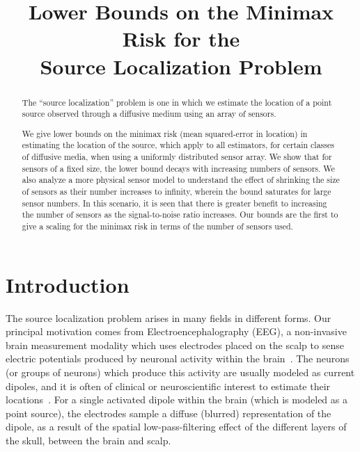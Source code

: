 \documentclass[conference,letterpaper]{IEEEtran}
\title{Lower Bounds on the Minimax Risk for the \\ Source Localization Problem}
\author{
	\IEEEauthorblockN{
		Praveen Venkatesh (\href{mailto:vpraveen@cmu.edu}{\texttt{vpraveen@cmu.edu}}) %
		and Pulkit Grover (\href{mailto:pulkit@cmu.edu}{\texttt{pulkit@cmu.edu}}) %
	}
	\IEEEauthorblockA{
		\textcolor{red}{Electrical \& Computer Engineering,
		and the Center for the Neural Basis of Cognition,
		Carnegie Mellon University}
	}
}
\begin{document}
\maketitle
\thispagestyle{plain}
\pagestyle{plain}

\begin{abstract}

The ``source localization'' problem is one in which we estimate the location of
a point source observed through a diffusive medium using an array of sensors.

We give lower bounds on the minimax risk (mean squared-error in location) in
estimating the location of the source, which apply to all estimators, for
certain classes of diffusive media, when using a uniformly distributed sensor
array. We show that for sensors of a fixed size, the lower bound decays with
increasing numbers of sensors. We also analyze a more physical sensor model to
understand the effect of shrinking the size of sensors as their number
increases to infinity, wherein the bound saturates for large sensor numbers.
In this scenario, it is seen that there is greater benefit to increasing the
number of sensors as the signal-to-noise ratio increases.  Our bounds are the
first to give a scaling for the minimax risk in terms of the number of sensors
used.


\end{abstract}

\section{Introduction}

The source localization problem arises in many fields in different forms. Our
principal motivation comes from Electroencephalography (EEG), a non-invasive
brain measurement modality which uses electrodes placed on the scalp to sense
electric potentials produced by neuronal activity within the
brain~\cite{Nunez2006Electric}. The neurons (or groups of neurons) which
produce this activity are usually modeled as current dipoles, and it is often
of clinical or neuroscientific interest to estimate their
locations~\cite{Baillet2001Electromagnetic}. For a single activated dipole
within the brain (which is modeled as a point source), the electrodes sample a
diffuse (blurred) representation of the dipole, as a result of the spatial
low-pass-filtering effect of the different layers of the skull, between the
brain and scalp.
\end{document}
